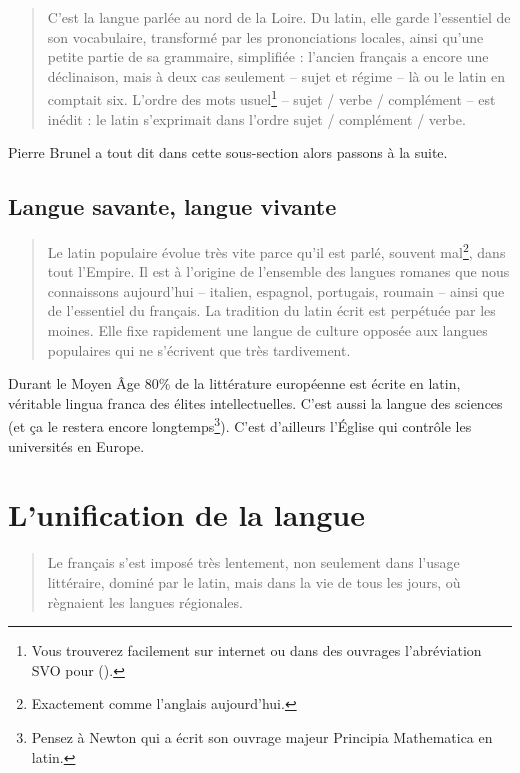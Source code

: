 \begin{quotation}
  C'est la langue parlée au nord de la Loire. Du latin, elle garde
  l'essentiel de son vocabulaire, transformé par les prononciations
  locales, ainsi qu'une petite partie de sa grammaire, simplifiée :
  l'ancien français a encore une déclinaison, mais à deux cas
  seulement -- sujet et régime -- là ou le latin en comptait
  six. L'ordre des mots usuel\footnote{Vous trouverez facilement sur
    internet ou dans des ouvrages l'abréviation SVO pour  ().} -- sujet / verbe / complément -- est
  inédit : le latin s'exprimait dans l'ordre sujet / complément / verbe.
\end{quotation}

Pierre Brunel a tout dit dans cette sous-section alors passons à la
suite.

\subsection{Langue savante, langue vivante}\label{subsec:lslv}

\begin{quotation}
  Le latin populaire évolue très vite parce qu'il est parlé, souvent
  mal\footnote{Exactement comme l'anglais aujourd'hui.}, dans tout
  l'Empire. Il est à l'origine de l'ensemble des langues romanes que
  nous connaissons aujourd'hui -- italien, espagnol, portugais,
  roumain -- ainsi que de l'essentiel du français.
  La tradition du latin écrit est perpétuée par les moines. Elle fixe
  rapidement une langue de culture opposée aux langues populaires qui
  ne s'écrivent que très tardivement.
\end{quotation}

Durant le Moyen Âge 80\% de la littérature européenne est écrite en
latin, véritable lingua franca des élites intellectuelles. C'est aussi
la langue des sciences (et ça le restera encore
longtemps\footnote{Pensez à Newton qui a écrit son ouvrage majeur
  Principia Mathematica en latin.}). C'est d'ailleurs l'\'Eglise qui
contrôle les universités en Europe.


\section{L'unification de la langue}\label{sec:unifr}

\begin{quote}
  Le français s'est imposé très lentement, non seulement dans l'usage
  littéraire, dominé par le latin, mais dans la vie de tous les jours,
  où règnaient les langues régionales.
\end{quote}

